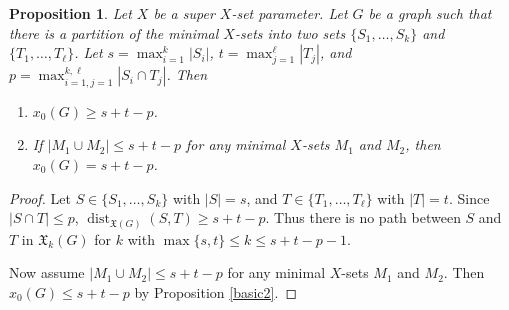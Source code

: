 \documentclass{article}
\def\blu{\color{blue}}
\numberwithin{figure}{section}
\numberwithin{table}{section}
\numberwithin{equation}{section}
\newtheorem{prop}[thm]{Proposition}
\theoremstyle{definition}
\newtheorem{rem}[thm]{Remark}
\theoremstyle{definition}
\theoremstyle{definition}
\newcommand{\ben}{\begin{enumerate}}
\newcommand{\een}{\end{enumerate}}
\newcommand{\bpf}{\begin{proof}}
\newcommand{\epf}{\end{proof}\ms}
\newcommand{\ms}{\medskip}
\newcommand{\mcs}{\mathcal{S}}
\newcommand{\mct}{\mathcal{T}}
\newcommand{\xtar}{\mathfrak{X}}%
\newcommand{\xxo}{x_0}
\newcommand{\dist}{\operatorname{dist}}
\newcommand{\diam}{\operatorname{diam}}
\begin{document}
{ 
 




 




\begin{prop}\label{p:part-min-sets}
Let $X$ be a  super $X$-set parameter. %
Let  $G$ be a graph such that there is a  partition of the minimal $X$-sets  into two sets $\{S_1,\dots,S_k\}$ and $\{T_1,\dots,T_\ell\}$.   %
Let $s=\max_{i=1}^k|S_i|$, $t=\max_{j=1}^\ell|T_j|$, and $p=\max_{i=1,j=1}^{k,\ell}|S_i\cap T_j|$.  Then 
\ben
\item $x_0(G)\ge s+t-p$.
\item If $|M_1\cup M_2|\le s+t-p$ for any minimal $X$-sets $M_1$ and $M_2$, then $x_0(G)= s+t-p$. 
\een
\end{prop}

\bpf 
Let $S \in \{S_1,\dots,S_k\}$ with $|S|=s$, and $T \in \{T_1,\dots,T_\ell\}$ with $|T|=t$.   Since $|S\cap T|\le p$,  $\dist_{\xtar(G)}(S,T)\ge s+t-p$. %
Thus there is no path between $S$ and $T$ in $\xtar_k(G)$ for $k$ with $\max\{s,t\}\le k\le s+t-p-1$.

Now assume $|M_1\cup M_2|\le s+t-p$ for any minimal $X$-sets $M_1$ and $M_2$.  Then $\xxo(G)\le s+t-p$ by Proposition \ref{basic2}.
\epf




}
\end{document}
